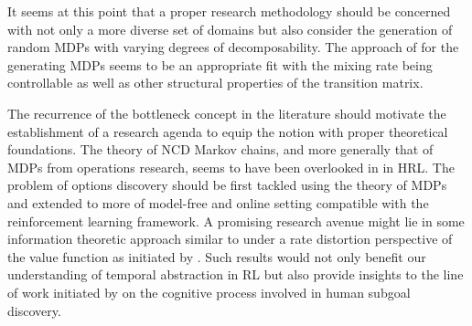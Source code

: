 It seems at this point that a proper research methodology should be concerned with not only a more diverse set of domains but also consider the generation of random MDPs with varying degrees of decomposability. The approach of \cite{Archibald1995} for the generating MDPs seems to be an appropriate fit with the mixing rate being controllable as well as other structural properties of the transition matrix. 

The recurrence of the bottleneck concept in the literature should motivate the establishment of a research agenda to equip the notion with proper theoretical foundations. The theory of NCD Markov chains, and more generally that of MDPs from operations research, seems to have been overlooked in in HRL. The problem of options discovery should be first tackled using the theory of MDPs and extended to more of model-free and online setting compatible with the reinforcement learning framework. A promising research avenue might lie in some information theoretic approach similar to \cite{Deng2011} under a rate distortion perspective of the value function as initiated by \cite{Still2012}. Such results would not only benefit our understanding of temporal abstraction in RL but also provide insights to the line of work initiated by \cite{Botvinick2012} on the cognitive process involved in human subgoal discovery.
